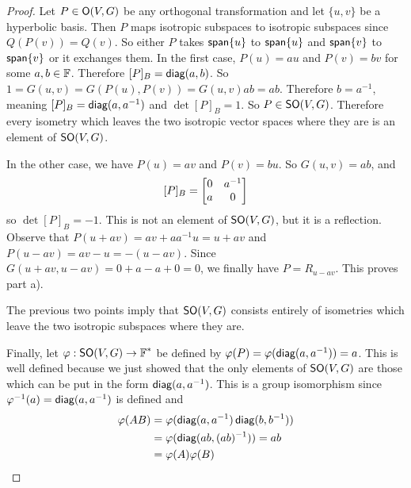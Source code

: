 \begin{proof}
    Let $P\in \operatorname{\textsf{O}}(V,G)$ be any orthogonal transformation and let $\{u,v\}$ be a hyperbolic basis. Then $P$ maps isotropic subspaces to isotropic subspaces since $Q(P(v))=Q(v)$. So either $P$ takes $\operatorname{\textsf{span}}\{u\}$ to $\operatorname{\textsf{span}}\{u\}$ and $\operatorname{\textsf{span}}\{v\}$ to $\operatorname{\textsf{span}}\{v\}$ or it exchanges them. In the first case, $P(u) = au$ and $P(v) = bv$ for some $a,b\in\operatorname{\mathbb{F}}$. Therefore $[P]_B = \operatorname{\textsf{diag}}(a,b)$. So $1=G(u,v)=G(P(u),P(v)) = G(u,v)ab=ab$. Therefore $b=a^{-1}$, meaning $[P]_B = \operatorname{\textsf{diag}}(a,a^{-1})$ and $\det [P]_B = 1$. So $P\in \operatorname{\textsf{SO}}(V,G)$. Therefore every isometry which leaves the two isotropic vector spaces where they are is an element of $\operatorname{\textsf{SO}}(V,G)$.

    In the other case, we have $P(u)=av$ and $P(v)=bu$. So $G(u,v)=ab$, and \[[P]_B = \begin{bmatrix}0&a^{-1}\\a&0\end{bmatrix}\]
    so $\det [P]_B = -1$. This is not an element of $\operatorname{\textsf{SO}}(V,G)$, but it is a reflection. Observe that $P(u+av) = av+a a^{-1}u = u+av$ and $P(u-av) = av-u = -(u-av)$. Since $G(u+av,u-av) = 0+a-a+0=0$, we finally have $P = R_{u-av}$. This proves part a).

    The previous two points imply that $\operatorname{\textsf{SO}}(V,G)$ consists entirely of isometries which leave the two isotropic subspaces where they are.

    Finally, let $\varphi : \operatorname{\textsf{SO}}(V,G) \to \operatorname{\mathbb{F}}^*$ be defined by $\varphi(P) = \varphi(\operatorname{\textsf{diag}}(a,a^{-1})) = a$. This is well defined because we just showed that the only elements of $\operatorname{\textsf{SO}}(V,G)$ are those which can be put in the form $\operatorname{\textsf{diag}}(a,a^{-1})$. This is a group isomorphism since $\varphi^{-1}(a) = \operatorname{\textsf{diag}}(a,a^{-1})$ is defined and 
    \begin{align*}\varphi(AB) &= \varphi(\operatorname{\textsf{diag}}(a,a^{-1})\operatorname{\textsf{diag}}(b,b^{-1})) \\&= \varphi(\operatorname{\textsf{diag}}(ab,(ab)^{-1})) = ab \\&= \varphi(A)\varphi(B)\end{align*}
\end{proof}

